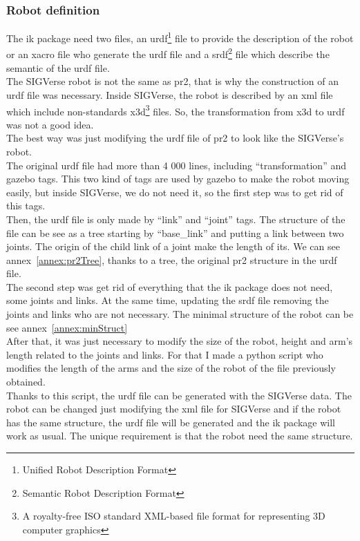 \subsubsection{Robot definition}
The ik package need two files, an urdf\footnote{Unified Robot Description Format} file to provide the description of the robot or an xacro file who generate the urdf file and a srdf\footnote{Semantic Robot Description Format} file which describe the semantic of the urdf file.\\

The SIGVerse robot is not the same as pr2, that is why the construction of an urdf file was necessary. Inside SIGVerse, the robot is described by an xml file which include non-standards x3d\footnote{A royalty-free ISO standard XML-based file format for representing 3D computer graphics} files. So, the transformation from x3d to urdf was not a good idea.\\
The best way was just modifying the urdf file of pr2 to look like the SIGVerse's robot.\\

The original urdf file had more than 4 000 lines, including ``transformation'' and gazebo tags. This two kind of tags are used by gazebo to make the robot moving easily, but inside SIGVerse, we do not need it, so the first step was to get rid of this tags.\\
Then, the urdf file is only made by ``link'' and ``joint'' tags. The structure of the file can be see as a tree starting by ``base\_link'' and putting a link between two joints. The origin of the child link of a joint make the length of its. We can see annex~\ref{annex:pr2Tree}, thanks to a tree, the original pr2 structure in the urdf file. \\
The second step was get rid of everything that the ik package does not need, some joints and links. At the same time, updating the srdf file removing the joints and links who are not necessary. The minimal structure of the robot can be see annex~\ref{annex:minStruct} \\
After that, it was just necessary to modify the size of the robot, height and arm's length related to the joints and links. For that I made a python script who modifies the length of the arms and the size of the robot of the file previously obtained.\\
Thanks to this script, the urdf file can be generated with the SIGVerse data. The robot can be changed just modifying the xml file for SIGVerse and if the robot has the same structure, the urdf file will be generated and the ik package will work as usual. The unique requirement is that the robot need the same structure.\\ 

